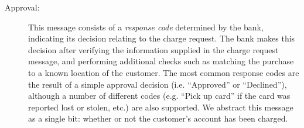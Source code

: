 \begin{description}
\item[Approval:]
This message consists of a \emph{response code} determined by the bank, indicating its decision relating to the charge request.
The bank makes this decision after verifying the information supplied in the charge request message, and performing additional checks such as matching the purchase to a known location of the customer.
The most common response codes are the result of a simple approval decision (i.e. ``Approved'' or ``Declined''),
although a number of different codes (e.g. ``Pick up card'' if the card was reported lost or stolen, etc.) are also supported.
We abstract this message as a single bit: whether or not the customer's account has been charged.

\end{description}
